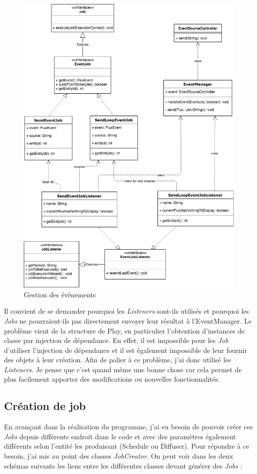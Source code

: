 \documentclass[french]{article}
\begin{document}
\newpage
\begin{figure}[h]
	\centering	
	\includegraphics[width=0.9\linewidth]{schemas/event_handling.png}%
	\caption{Gestion des événements}
\end{figure}

Il convient de se demander pourquoi les \textit{Listeners} sont-ils utilisés et pourquoi les \textit{Jobs} ne pourraient-ils pas directement envoyer leur résultat à l'EventManager. Le problème vient de la structure de Play, en particulier l'obtention d'instances de classe par injection de dépendance. En effet, il est impossible pour les \textit{Job} d'utiliser l'injection de dépendance et il est également impossible de leur fournir des objets à leur création. Afin de palier à ce problème, j'ai donc utilisé les \textit{Listeners}. Je pense que c'est quand même une bonne chose car cela permet de plus facilement apporter des modifications ou nouvelles fonctionnalités.

\newpage
\subsection{Création de job}
En avançant dans la réalisation du programme, j'ai eu besoin de pouvoir créer ces \textit{Jobs} depuis différents endroit dans le code et avec des paramètres également différents selon l'entité les produisant (Schedule ou Diffuser). Pour répondre à ce besoin, j'ai mis au point des classes \textit{JobCreator}. On peut voir dans les deux schémas suivants les liens entre les différentes classes devant générer des \textit{Jobs} : \newline
\end{document}
